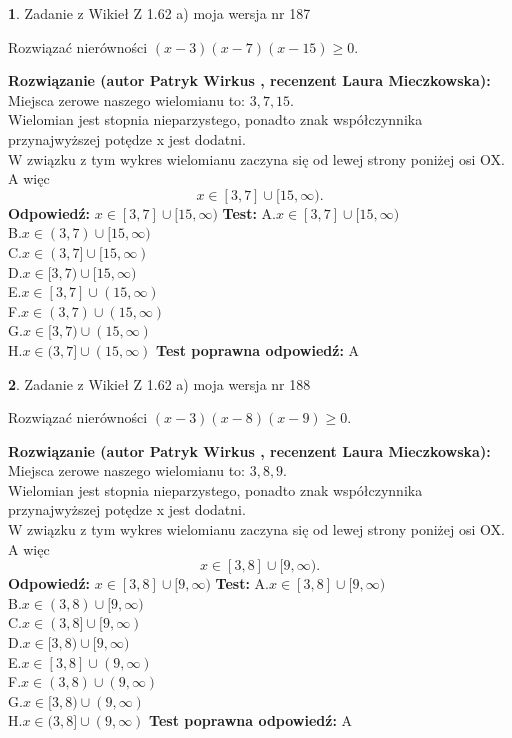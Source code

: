 \documentclass[12pt, a4paper]{article}
\theoremstyle{definition} %
\newtheorem{zad}{}
\newcommand{\zadStart}[1]{\begin{zad}#1\newline}
\newcommand{\zadStop}{\end{zad}}
\newcommand{\rozwStart}[2]{\noindent \textbf{Rozwiązanie (autor #1 , recenzent #2): }\newline}
\newcommand{\rozwStop}{\newline}
\newcommand{\odpStart}{\noindent \textbf{Odpowiedź:}\newline}
\newcommand{\odpStop}{\newline}
\newcommand{\testStart}{\noindent \textbf{Test:}\newline}
\newcommand{\testStop}{\newline}
\newcommand{\kluczStart}{\noindent \textbf{Test poprawna odpowiedź:}\newline}
\newcommand{\kluczStop}{\newline}
\begin{document}
\zadStart{Zadanie z Wikieł Z 1.62 a) moja wersja nr 187}

Rozwiązać nierówności $(x-3)(x-7)(x-15)\ge0$.
\zadStop
\rozwStart{Patryk Wirkus}{Laura Mieczkowska}
Miejsca zerowe naszego wielomianu to: $3, 7, 15$.\\
Wielomian jest stopnia nieparzystego, ponadto znak współczynnika przy\linebreak najwyższej potędze x jest dodatni.\\ W związku z tym wykres wielomianu zaczyna się od lewej strony poniżej osi OX. A więc $$x \in [3,7] \cup [15,\infty).$$
\rozwStop
\odpStart
$x \in [3,7] \cup [15,\infty)$
\odpStop
\testStart
A.$x \in [3,7] \cup [15,\infty)$\\
B.$x \in (3,7) \cup [15,\infty)$\\
C.$x \in (3,7] \cup [15,\infty)$\\
D.$x \in [3,7) \cup [15,\infty)$\\
E.$x \in [3,7] \cup (15,\infty)$\\
F.$x \in (3,7) \cup (15,\infty)$\\
G.$x \in [3,7) \cup (15,\infty)$\\
H.$x \in (3,7] \cup (15,\infty)$
\testStop
\kluczStart
A
\kluczStop



\zadStart{Zadanie z Wikieł Z 1.62 a) moja wersja nr 188}

Rozwiązać nierówności $(x-3)(x-8)(x-9)\ge0$.
\zadStop
\rozwStart{Patryk Wirkus}{Laura Mieczkowska}
Miejsca zerowe naszego wielomianu to: $3, 8, 9$.\\
Wielomian jest stopnia nieparzystego, ponadto znak współczynnika przy\linebreak najwyższej potędze x jest dodatni.\\ W związku z tym wykres wielomianu zaczyna się od lewej strony poniżej osi OX. A więc $$x \in [3,8] \cup [9,\infty).$$
\rozwStop
\odpStart
$x \in [3,8] \cup [9,\infty)$
\odpStop
\testStart
A.$x \in [3,8] \cup [9,\infty)$\\
B.$x \in (3,8) \cup [9,\infty)$\\
C.$x \in (3,8] \cup [9,\infty)$\\
D.$x \in [3,8) \cup [9,\infty)$\\
E.$x \in [3,8] \cup (9,\infty)$\\
F.$x \in (3,8) \cup (9,\infty)$\\
G.$x \in [3,8) \cup (9,\infty)$\\
H.$x \in (3,8] \cup (9,\infty)$
\testStop
\kluczStart
A
\kluczStop
\end{document}
